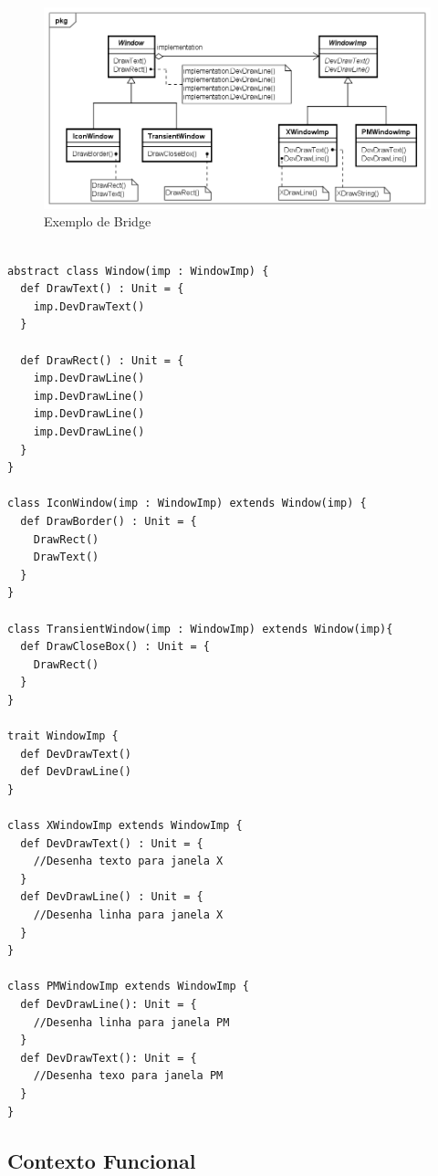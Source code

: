 \begin{figure}[htb]
	\caption{\label{bridge_exemplo}Exemplo de Bridge}
	\begin{center}
	    \includegraphics[scale=0.5]{5_padroes-contexto-funcional/5.2_estruturais/5.2.2_bridge/bridge_exemplo.png}
	\end{center}
\end{figure}

\begin{lstlisting}[caption={Bridge Orientado a Objetos},label=oobridge]

abstract class Window(imp : WindowImp) {
  def DrawText() : Unit = {
    imp.DevDrawText()
  }

  def DrawRect() : Unit = {
    imp.DevDrawLine()
    imp.DevDrawLine()
    imp.DevDrawLine()
    imp.DevDrawLine()
  }
}

class IconWindow(imp : WindowImp) extends Window(imp) {
  def DrawBorder() : Unit = {
    DrawRect()
    DrawText()
  }
}

class TransientWindow(imp : WindowImp) extends Window(imp){
  def DrawCloseBox() : Unit = {
    DrawRect()
  }
}

trait WindowImp {
  def DevDrawText()
  def DevDrawLine()
}

class XWindowImp extends WindowImp {
  def DevDrawText() : Unit = {
    //Desenha texto para janela X
  }
  def DevDrawLine() : Unit = {
    //Desenha linha para janela X
  }
}

class PMWindowImp extends WindowImp {
  def DevDrawLine(): Unit = {
    //Desenha linha para janela PM
  }
  def DevDrawText(): Unit = {
    //Desenha texo para janela PM
  }
}

\end{lstlisting}


\subsection*{Contexto Funcional}

